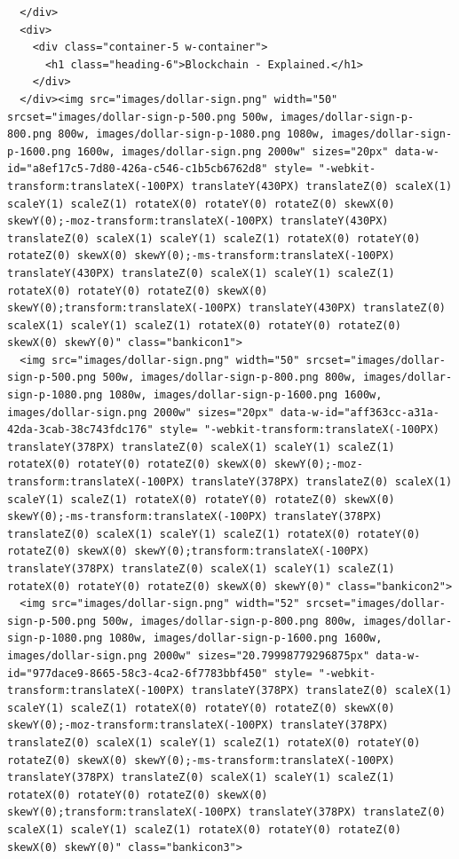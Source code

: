 \begin{lstlisting}
  </div>
  <div>
    <div class="container-5 w-container">
      <h1 class="heading-6">Blockchain - Explained.</h1>
    </div>
  </div><img src="images/dollar-sign.png" width="50" srcset="images/dollar-sign-p-500.png 500w, images/dollar-sign-p-800.png 800w, images/dollar-sign-p-1080.png 1080w, images/dollar-sign-p-1600.png 1600w, images/dollar-sign.png 2000w" sizes="20px" data-w-id="a8ef17c5-7d80-426a-c546-c1b5cb6762d8" style= "-webkit-transform:translateX(-100PX) translateY(430PX) translateZ(0) scaleX(1) scaleY(1) scaleZ(1) rotateX(0) rotateY(0) rotateZ(0) skewX(0) skewY(0);-moz-transform:translateX(-100PX) translateY(430PX) translateZ(0) scaleX(1) scaleY(1) scaleZ(1) rotateX(0) rotateY(0) rotateZ(0) skewX(0) skewY(0);-ms-transform:translateX(-100PX) translateY(430PX) translateZ(0) scaleX(1) scaleY(1) scaleZ(1) rotateX(0) rotateY(0) rotateZ(0) skewX(0) skewY(0);transform:translateX(-100PX) translateY(430PX) translateZ(0) scaleX(1) scaleY(1) scaleZ(1) rotateX(0) rotateY(0) rotateZ(0) skewX(0) skewY(0)" class="bankicon1">
  <img src="images/dollar-sign.png" width="50" srcset="images/dollar-sign-p-500.png 500w, images/dollar-sign-p-800.png 800w, images/dollar-sign-p-1080.png 1080w, images/dollar-sign-p-1600.png 1600w, images/dollar-sign.png 2000w" sizes="20px" data-w-id="aff363cc-a31a-42da-3cab-38c743fdc176" style= "-webkit-transform:translateX(-100PX) translateY(378PX) translateZ(0) scaleX(1) scaleY(1) scaleZ(1) rotateX(0) rotateY(0) rotateZ(0) skewX(0) skewY(0);-moz-transform:translateX(-100PX) translateY(378PX) translateZ(0) scaleX(1) scaleY(1) scaleZ(1) rotateX(0) rotateY(0) rotateZ(0) skewX(0) skewY(0);-ms-transform:translateX(-100PX) translateY(378PX) translateZ(0) scaleX(1) scaleY(1) scaleZ(1) rotateX(0) rotateY(0) rotateZ(0) skewX(0) skewY(0);transform:translateX(-100PX) translateY(378PX) translateZ(0) scaleX(1) scaleY(1) scaleZ(1) rotateX(0) rotateY(0) rotateZ(0) skewX(0) skewY(0)" class="bankicon2">
  <img src="images/dollar-sign.png" width="52" srcset="images/dollar-sign-p-500.png 500w, images/dollar-sign-p-800.png 800w, images/dollar-sign-p-1080.png 1080w, images/dollar-sign-p-1600.png 1600w, images/dollar-sign.png 2000w" sizes="20.79998779296875px" data-w-id="977dace9-8665-58c3-4ca2-6f7783bbf450" style= "-webkit-transform:translateX(-100PX) translateY(378PX) translateZ(0) scaleX(1) scaleY(1) scaleZ(1) rotateX(0) rotateY(0) rotateZ(0) skewX(0) skewY(0);-moz-transform:translateX(-100PX) translateY(378PX) translateZ(0) scaleX(1) scaleY(1) scaleZ(1) rotateX(0) rotateY(0) rotateZ(0) skewX(0) skewY(0);-ms-transform:translateX(-100PX) translateY(378PX) translateZ(0) scaleX(1) scaleY(1) scaleZ(1) rotateX(0) rotateY(0) rotateZ(0) skewX(0) skewY(0);transform:translateX(-100PX) translateY(378PX) translateZ(0) scaleX(1) scaleY(1) scaleZ(1) rotateX(0) rotateY(0) rotateZ(0) skewX(0) skewY(0)" class="bankicon3">

\end{lstlisting}
